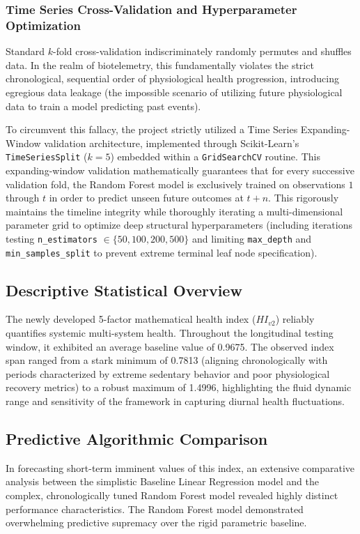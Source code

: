 \documentclass[11pt,a4paper]{article}
\begin{document}
\subsubsection{Time Series Cross-Validation and Hyperparameter Optimization}
Standard $k$-fold cross-validation indiscriminately randomly permutes and shuffles data. In the realm of biotelemetry, this fundamentally violates the strict chronological, sequential order of physiological health progression, introducing egregious data leakage (the impossible scenario of utilizing future physiological data to train a model predicting past events). 

To circumvent this fallacy, the project strictly utilized a Time Series Expanding-Window validation architecture, implemented through Scikit-Learn's \texttt{TimeSeriesSplit} ($k=5$) embedded within a \texttt{GridSearchCV} routine. This expanding-window validation mathematically guarantees that for every successive validation fold, the Random Forest model is exclusively trained on observations $1$ through $t$ in order to predict unseen future outcomes at $t+n$. This rigorously maintains the timeline integrity while thoroughly iterating a multi-dimensional parameter grid to optimize deep structural hyperparameters (including iterations testing \texttt{n\_estimators} $\in \{50, 100, 200, 500\}$ and limiting \texttt{max\_depth} and \texttt{min\_samples\_split} to prevent extreme terminal leaf node specification).
\subsection{Descriptive Statistical Overview}
The newly developed 5-factor mathematical health index ($HI_{v2}$) reliably quantifies systemic multi-system health. Throughout the longitudinal testing window, it exhibited an average baseline value of 0.9675. The observed index span ranged from a stark minimum of 0.7813 (aligning chronologically with periods characterized by extreme sedentary behavior and poor physiological recovery metrics) to a robust maximum of 1.4996, highlighting the fluid dynamic range and sensitivity of the framework in capturing diurnal health fluctuations.

\subsection{Predictive Algorithmic Comparison}
In forecasting short-term imminent values of this index, an extensive comparative analysis between the simplistic Baseline Linear Regression model and the complex, chronologically tuned Random Forest model revealed highly distinct performance characteristics. The Random Forest model demonstrated overwhelming predictive supremacy over the rigid parametric baseline. 
\end{document}
